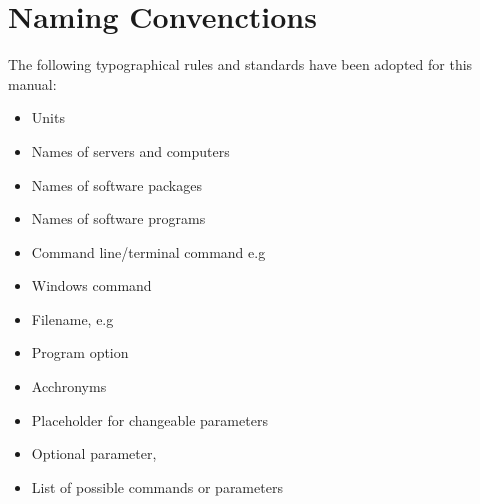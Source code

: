 \documentclass[12pt]{report}
\begin{document}
 \chapter*{Naming Convenctions }
 The following typographical rules and standards \cite{standard1} \cite{standard2} have been adopted for this manual:
 \begin{itemize}
 	\item {} Units
 	\item {} Names of servers and computers
 	\item {} Names of software packages
 	\item {} Names of software programs
 	\item {} Command line/terminal command e.g
 	\item {} Windows command
 	\item {} Filename, e.g
 	\item {} Program option
 	\item {} Acchronyms
 	\item {} Placeholder for changeable parameters
 	\item {} Optional parameter,
 	\item{ } List of possible commands or parameters
 	
 \end{itemize}
\end{document}
